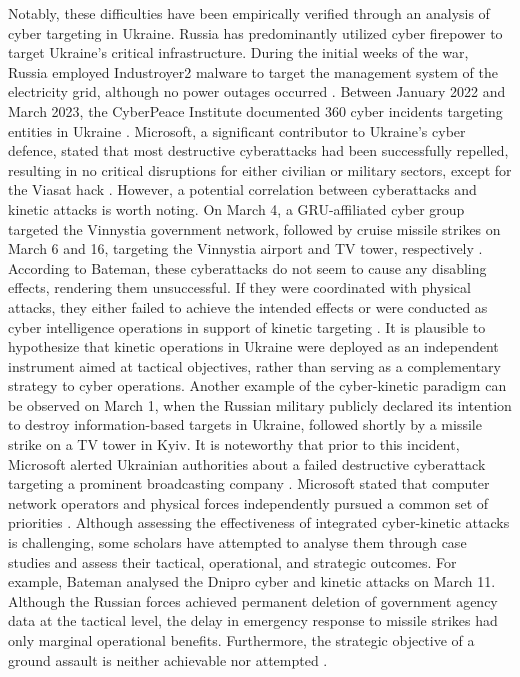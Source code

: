 Notably, these difficulties have been empirically verified through an analysis of cyber targeting in Ukraine. Russia has predominantly utilized cyber firepower to target Ukraine's critical infrastructure. During the initial weeks of the war, Russia employed Industroyer2 malware to target the management system of the electricity grid, although no power outages occurred \textcite{willett_2022_the}. Between January 2022 and March 2023, the CyberPeace Institute documented 360 cyber incidents targeting entities in Ukraine \autocite[3a]{cyberpeaceinstitute_2023_cyber}. Microsoft, a significant contributor to Ukraine's cyber defence, stated that most destructive cyberattacks had been successfully repelled, resulting in no critical disruptions for either civilian or military sectors, except for the Viasat hack \autocite{smith_2022_defending}. However, a potential correlation between cyberattacks and kinetic attacks is worth noting. On March 4, a GRU-affiliated cyber group targeted the Vinnystia government network, followed by cruise missile strikes on March 6 and 16, targeting the Vinnystia airport and TV tower, respectively \autocite[8]{smith_2022_defending}. According to Bateman, these cyberattacks do not seem to cause any disabling effects, rendering them unsuccessful. If they were coordinated with physical attacks, they either failed to achieve the intended effects or were conducted as cyber intelligence operations in support of kinetic targeting \autocite[9]{baetman_2022_russias}. It is plausible to hypothesize that kinetic operations in Ukraine were deployed as an independent instrument aimed at tactical objectives, rather than serving as a complementary strategy to cyber operations. Another example of the cyber-kinetic paradigm can be observed on March 1, when the Russian military publicly declared its intention to destroy information-based targets in Ukraine, followed shortly by a missile strike on a TV tower in Kyiv. It is noteworthy that prior to this incident, Microsoft alerted Ukrainian authorities about a failed destructive cyberattack targeting a prominent broadcasting company \parencite{baetman_2022_russias, smith_2022_defending}. Microsoft stated that computer network operators and physical forces independently pursued a common set of priorities \autocite{microsoft_2022_an}. Although assessing the effectiveness of integrated cyber-kinetic attacks is challenging, some scholars have attempted to analyse them through case studies and assess their tactical, operational, and strategic outcomes. For example, Bateman analysed the Dnipro cyber and kinetic attacks on March 11. Although the Russian forces achieved permanent deletion of government agency data at the tactical level, the delay in emergency response to missile strikes had only marginal operational benefits. Furthermore, the strategic objective of a ground assault is neither achievable nor attempted \autocite[11]{baetman_2022_russias}.

